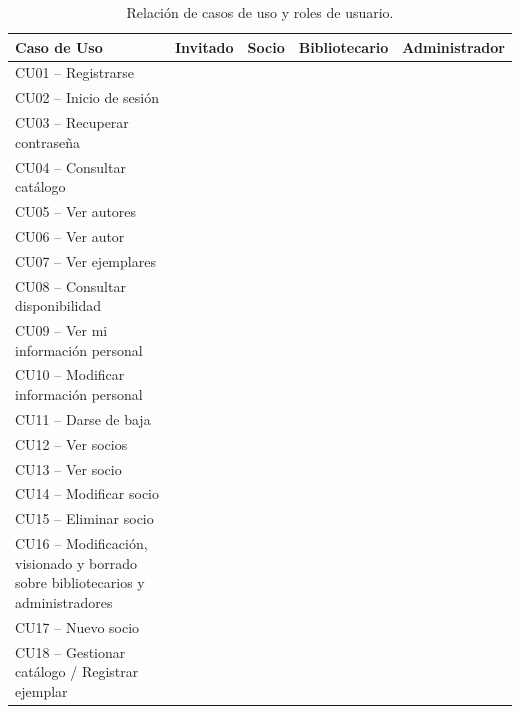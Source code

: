 \begin{table}[H]
	\centering
	\caption{Relación de casos de uso y roles de usuario.}
	\label{tab:relacion_cu_actores}
	\small
	\begin{tabularx}{\textwidth}{X c c c c}
		\toprule
		\textbf{Caso de Uso} & \textbf{Invitado} & \textbf{Socio} & \textbf{Bibliotecario} & \textbf{Administrador} \\
		\midrule
		CU01 -- Registrarse & \checkmark & & & \\
		\addlinespace
		CU02 -- Inicio de sesión & & \checkmark & \checkmark & \checkmark \\
		\addlinespace
		CU03 -- Recuperar contraseña & & \checkmark & \checkmark & \checkmark \\
		\addlinespace
		CU04 -- Consultar catálogo & \checkmark & \checkmark & \checkmark & \checkmark \\
		\addlinespace
		CU05 -- Ver autores & \checkmark & \checkmark & \checkmark & \checkmark \\
		\addlinespace
		CU06 -- Ver autor & \checkmark & \checkmark & \checkmark & \checkmark \\
		\addlinespace
		CU07 -- Ver ejemplares & \checkmark & \checkmark & \checkmark & \checkmark \\
		\addlinespace
		CU08 -- Consultar disponibilidad & \checkmark & \checkmark & \checkmark & \checkmark \\
		\addlinespace
		CU09 -- Ver mi información personal & & \checkmark & \checkmark & \checkmark \\
		\addlinespace
		CU10 -- Modificar información personal & & \checkmark & \checkmark & \checkmark \\
		\addlinespace
		CU11 -- Darse de baja & & \checkmark & & \\
		\addlinespace
		CU12 -- Ver socios & & & \checkmark & \checkmark \\
		\addlinespace
		CU13 -- Ver socio & & & \checkmark & \checkmark \\
		\addlinespace
		CU14 -- Modificar socio & & & \checkmark & \checkmark \\
		\addlinespace
		CU15 -- Eliminar socio & & & \checkmark & \checkmark \\
		\addlinespace
		CU16 -- Modificación, visionado y borrado sobre bibliotecarios y administradores & & & & \checkmark \\
		\addlinespace
		CU17 -- Nuevo socio & & & \checkmark & \checkmark \\
		\addlinespace
		CU18 -- Gestionar catálogo / Registrar ejemplar & & & \checkmark & \checkmark \\

\end{tabularx}
\end{table}

